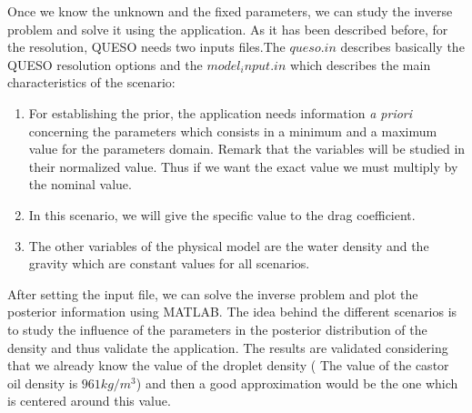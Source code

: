 \documentclass{article}
\newcounter{subsubsubsection}[subsubsection]
\begin{document}
 

Once we know the unknown and the fixed parameters, we can study the inverse problem and solve it using the application. As it has been described before, for the resolution, QUESO needs two inputs files.The \textit{$queso.in$} describes basically the QUESO resolution options and the \textit{$model_input.in$} which describes the main characteristics of the scenario:
\begin{enumerate}
\item For establishing the prior, the application needs information \textit{a priori} concerning the parameters which consists in  a minimum and a maximum value for the parameters  domain. Remark that the variables will be studied in their normalized value. Thus if we want the exact value we must multiply by the nominal value.
\item In this scenario, we will give the specific value to the drag coefficient.
\item The other variables of the physical model are the water density and the gravity which are  constant values for all  scenarios.
\end{enumerate}
After setting the input file, we can solve the inverse problem and plot the posterior information using MATLAB. The idea behind the different scenarios  is to study the influence of the parameters in the posterior distribution of the density and thus validate the application. The results are validated  considering that we already know the value of the droplet density ( The value of the  castor oil density is $961 kg/m^3$) and then a good approximation would be the one which is centered around this value.
\end{document}
